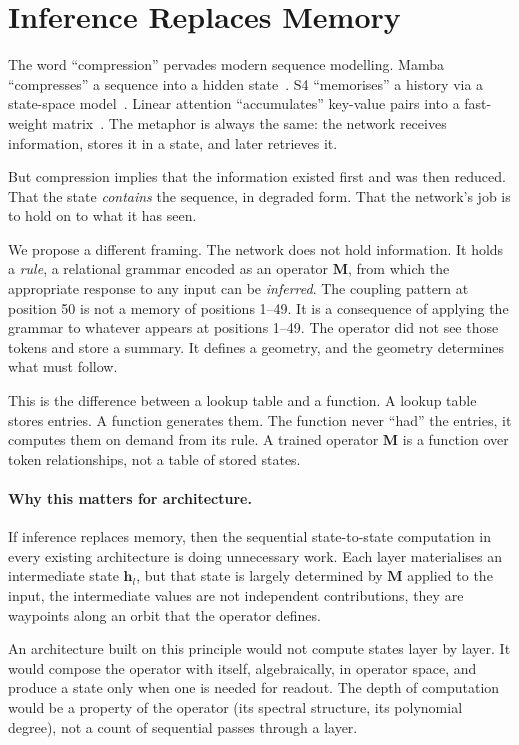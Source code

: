 \documentclass[11pt, a4paper]{article}
\newcommand{\M}{\mathbf{M}}
\newcommand{\h}{\mathbf{h}}
\theoremstyle{plain}
\theoremstyle{definition}
\theoremstyle{remark}
\begin{document}
\section{Inference Replaces Memory}

The word ``compression'' pervades modern sequence modelling.
Mamba ``compresses'' a sequence into a hidden state~\cite{gu2023mamba}.
S4 ``memorises'' a history via a state-space model~\cite{gu2022s4}.
Linear attention ``accumulates'' key-value pairs into a fast-weight matrix~\cite{schlag2021linear}.
The metaphor is always the same: the network receives information, stores it in a state, and later retrieves it.

But compression implies that the information existed first and was then reduced.
That the state \emph{contains} the sequence, in degraded form.
That the network's job is to hold on to what it has seen.

We propose a different framing.
The network does not hold information.
It holds a \emph{rule}, a relational grammar encoded as an operator $\M$, from which the appropriate response to any input can be \emph{inferred}.
The coupling pattern at position 50 is not a memory of positions 1--49.
It is a consequence of applying the grammar to whatever appears at positions 1--49.
The operator did not see those tokens and store a summary.
It defines a geometry, and the geometry determines what must follow.

This is the difference between a lookup table and a function.
A lookup table stores entries.
A function generates them.
The function never ``had'' the entries, it computes them on demand from its rule.
A trained operator $\M$ is a function over token relationships, not a table of stored states.

\paragraph{Why this matters for architecture.}
If inference replaces memory, then the sequential state-to-state computation in every existing architecture is doing unnecessary work.
Each layer materialises an intermediate state $\h_l$, but that state is largely determined by $\M$ applied to the input, the intermediate values are not independent contributions, they are waypoints along an orbit that the operator defines.

An architecture built on this principle would not compute states layer by layer.
It would compose the operator with itself, algebraically, in operator space, and produce a state only when one is needed for readout.
The depth of computation would be a property of the operator (its spectral structure, its polynomial degree), not a count of sequential passes through a layer.
\end{document}
